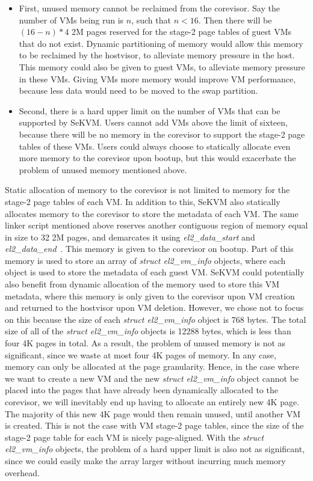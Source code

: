 \begin{itemize}
    \item First, unused memory cannot be reclaimed from the corevisor. Say
    the number of VMs being run is $n$, such that $n < 16$. Then there will be
    $(16 - n) * 4$ 2M pages reserved for the stage-2 page tables of guest VMs that
    do not exist. Dynamic partitioning of memory would allow this memory to be reclaimed by the hostvisor, to
    alleviate memory pressure in the host. This memory could also be given to guest VMs, to
    alleviate memory pressure in these VMs. Giving VMs more memory would improve
    VM performance, because less data would need to be moved to the swap partition. 
    \item Second, there is a hard upper limit on the number of VMs that can
    be supported by SeKVM. Users cannot add VMs above the limit of sixteen,
    because there will be no memory in the corevisor to support the stage-2
    page tables of these VMs. Users could always choose to statically allocate
    even more memory to the corevisor upon bootup, but this would exacerbate
    the problem of unused memory mentioned above.
\end{itemize}

Static allocation of memory to the corevisor is not limited to memory for the
stage-2 page tables of each VM. In addition to this, SeKVM also statically
allocates memory to the corevisor to store the metadata of each VM. The same linker script
mentioned above reserves another contiguous region of memory equal in size to 32
2M pages, and demarcates it using \textit{el2\_data\_start}
and \textit{el2\_data\_end}~\cite{vmlinux.lds.S}. This memory is given to the
corevisor on bootup. Part of this memory is used to
store an array of \textit{struct el2\_vm\_info} objects, where each object is
used to store the metadata of each guest VM. SeKVM could potentially also benefit
from dynamic allocation of the memory used to store this VM metadata, where
this memory is only given to the corevisor upon VM creation and returned to the
hostvisor upon VM deletion. However,
we chose not to focus on this because the size of each \textit{struct el2\_vm\_info} object
is 768 bytes. The total size of all of the \textit{struct el2\_vm\_info} objects
is 12288 bytes, which is less than four 4K pages in total. As a result, the
problem of unused memory is not as significant, since we waste at most four
4K pages of memory. In any case, memory can only be allocated at the
page granularity. Hence, in the case where we want to create a new VM and the new \textit{struct el2\_vm\_info} object
cannot be placed into the pages that have already been dynamically allocated to the corevisor, we will
inevitably end up having to allocate an entirely new 4K page. The majority of this new 4K page would then remain unused, until another VM is created. This
is not the case with VM stage-2 page tables, since the size of the stage-2 page
table for each VM is nicely page-aligned. With the \textit{struct el2\_vm\_info} objects, the problem of a hard upper limit
is also not as significant, since we could easily make the array larger without
incurring much memory overhead.

